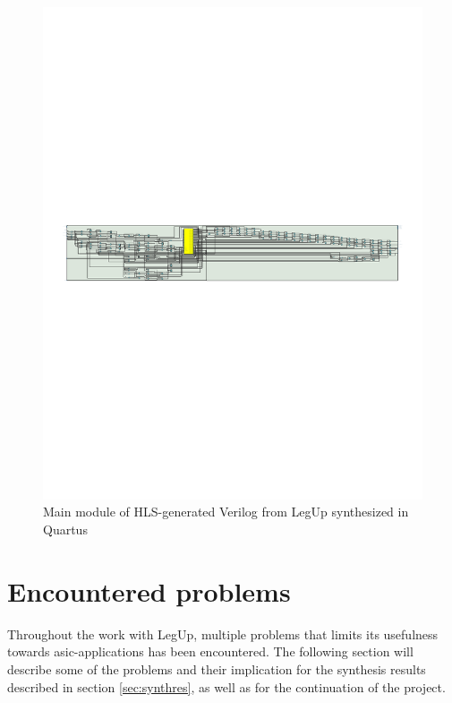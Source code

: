 \begin{figure}[hbpt]
\centering
\includegraphics[trim=1cm 12cm 1cm 12cm,clip=true, width=\textwidth]{../figs/LegUpOutputMain.pdf}
\caption{\label{fig:legupoumain}Main module of HLS-generated Verilog from LegUp synthesized in Quartus}
\end{figure}

\section{\label{sec:encprob}Encountered problems}
Throughout the work with LegUp, multiple problems that limits its usefulness towards \gls{asic}-applications has been encountered. The following section will describe some of the problems and their implication for the synthesis results described in section \ref{sec:synthres}, as well as for the continuation of the project.
